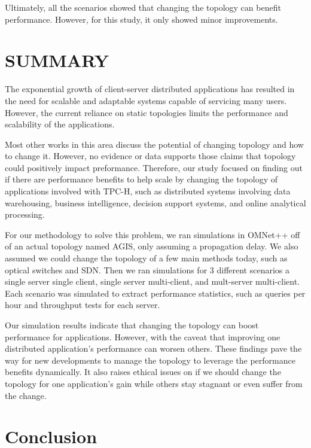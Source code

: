 	Ultimately, all the scenarios showed that changing the topology can benefit performance.  However, for this study, it only showed minor improvements. 




\section{SUMMARY}

The exponential growth of client-server distributed applications has resulted in the need for scalable and adaptable systems capable of servicing many users. However, the current reliance on static topologies limits the performance and scalability of the applications. 

	Most other works in this area discuss the potential of changing topology and how to change it. However, no evidence or data supports those claims that topology could positively impact preformance. Therefore, our study focused on finding out if there are performance benefits to help scale by changing the topology of applications involved with TPC-H, such as distributed systems involving data warehousing, business intelligence, decision support systems, and online analytical processing.

	For our methodology to solve this problem, we ran simulations in OMNet++ off of an actual topology named AGIS, only assuming a propagation delay. We also assumed we could change the topology of a few main methods today, such as optical switches and SDN. Then we ran simulations for 3 different scenarios a single server single client, single server multi-client, and mult-server multi-client. Each scenario was simulated to extract performance statistics, such as queries per hour and throughput tests for each server.

	Our simulation results indicate that changing the topology can boost performance for applications. However, with the caveat that improving one distributed application's performance can worsen others. These findings pave the way for new developments to manage the topology to leverage the performance benefits dynamically. It also raises ethical issues on if we should change the topology for one application's gain while others stay stagnant or even suffer from the change.



\section{Conclusion}


